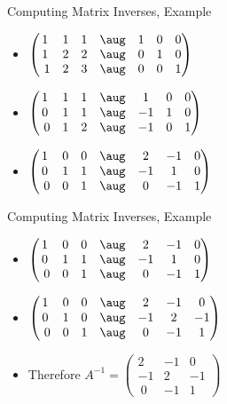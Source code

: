 \documentclass{beamer}
\begin{document}

\begin{frame}{Computing Matrix Inverses, Example}

\begin{itemize}
\item
$
\begin{pmatrix}
1 & 1 & 1 & \aug & 1 & 0 & 0\\
1 & 2 & 2 & \aug & 0 & 1 & 0\\\
1 & 2 & 3 & \aug & 0 & 0 & 1
\end{pmatrix}
$
\item
$
\begin{pmatrix}
1 & 1 & 1 & \aug &  1 & 0 & 0\\
0 & 1 & 1 & \aug & -1 & 1 & 0\\\
0 & 1 & 2 & \aug & -1 & 0 & 1
\end{pmatrix}
$
\item
$
\begin{pmatrix}
1 & 0 & 0 & \aug &  2 & -1 & 0\\
0 & 1 & 1 & \aug & -1 &  1 & 0\\\
0 & 0 & 1 & \aug &  0 &  -1 & 1
\end{pmatrix}
$
\end{itemize}
\end{frame}

\begin{frame}{Computing Matrix Inverses, Example}

\begin{itemize}
\item
$
\begin{pmatrix}
1 & 0 & 0 & \aug &  2 & -1 & 0\\
0 & 1 & 1 & \aug & -1 &  1 & 0\\\
0 & 0 & 1 & \aug &  0 &  -1 & 1
\end{pmatrix}
$
\item
$
\begin{pmatrix}
1 & 0 & 0 & \aug &  2 & -1 & 0\\
0 & 1 & 0 & \aug & -1 &  2 & -1\\\
0 & 0 & 1 & \aug &  0 &  -1 & 1
\end{pmatrix}
$
\item Therefore $A^{-1}=
\begin{pmatrix}
2 & -1 & 0\\
-1 &  2 & -1\\\
0 &  -1 & 1
\end{pmatrix}
$
\end{itemize}

\end{frame}
\end{document}
